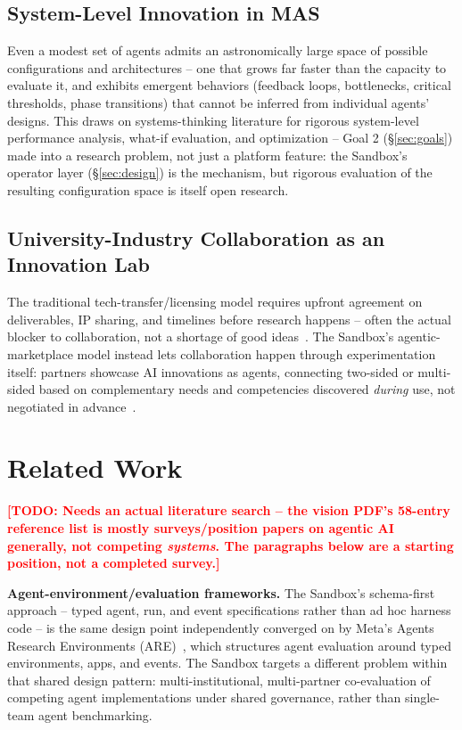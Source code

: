 \documentclass[10pt,conference]{IEEEtran}
\newcommand{\todo}[1]{\textcolor{red}{\textbf{[TODO: #1]}}}
\begin{document}
\subsection{System-Level Innovation in MAS}
Even a modest set of agents admits an astronomically large space of possible
configurations and architectures -- one that grows far faster than the
capacity to evaluate it, and exhibits emergent behaviors (feedback loops,
bottlenecks, critical thresholds, phase transitions) that cannot be inferred
from individual agents' designs. This draws on systems-thinking literature
for rigorous system-level performance analysis, what-if evaluation, and
optimization -- Goal 2 (\S\ref{sec:goals}) made into a research problem, not
just a platform feature: the Sandbox's operator layer
(\S\ref{sec:design}) is the mechanism, but rigorous evaluation of the
resulting configuration space is itself open research.

\subsection{University-Industry Collaboration as an Innovation Lab}
The traditional tech-transfer/licensing model requires upfront agreement on
deliverables, IP sharing, and timelines before research happens -- often the
actual blocker to collaboration, not a shortage of good
ideas~\cite{hargadon2003breakthroughs}. The Sandbox's agentic-marketplace
model instead lets collaboration happen through experimentation itself:
partners showcase AI innovations as agents, connecting two-sided or
multi-sided based on complementary needs and competencies discovered
\emph{during} use, not negotiated in
advance~\cite{criado2018introduction,garciaarteagoitia2024experimentation}.

\section{Related Work}
\label{sec:related}
\todo{Needs an actual literature search -- the vision PDF's 58-entry
reference list is mostly surveys/position papers on agentic AI generally,
not competing \emph{systems}. The paragraphs below are a starting position,
not a completed survey.}

\textbf{Agent-environment/evaluation frameworks.} The Sandbox's
schema-first approach -- typed agent, run, and event specifications rather
than ad hoc harness code -- is the same design point independently
converged on by Meta's Agents Research Environments
(ARE)~\cite{froger2025arescalingagentenvironments}, which structures agent
evaluation around typed environments, apps, and events. The Sandbox targets
a different problem within that shared design pattern: multi-institutional,
multi-partner co-evaluation of competing agent implementations under shared
governance, rather than single-team agent benchmarking.
\end{document}
